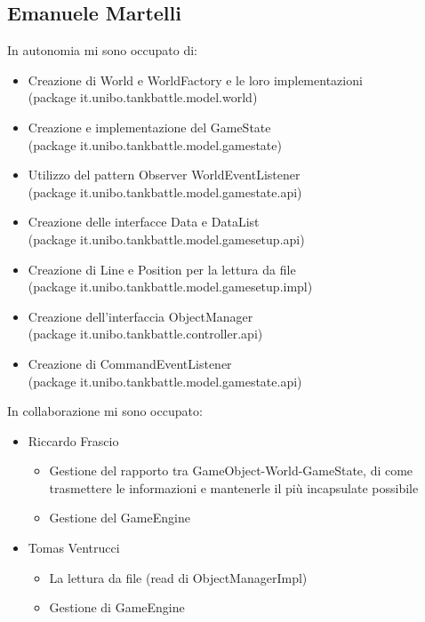 \documentclass[a4paper,12pt]{report}
\begin{document}
\subsection*{Emanuele Martelli}
In autonomia mi sono occupato di:
\begin{itemize}
	\item Creazione di World e WorldFactory e le loro implementazioni \\(package it.unibo.tankbattle.model.world)
	\item Creazione e implementazione del GameState\\ (package it.unibo.tankbattle.model.gamestate)
    \item Utilizzo del pattern Observer WorldEventListener\\
(package it.unibo.tankbattle.model.gamestate.api)
    \item Creazione delle interfacce Data e DataList \\
(package it.unibo.tankbattle.model.gamesetup.api)
    \item Creazione di Line e Position per la lettura da file \\
(package it.unibo.tankbattle.model.gamesetup.impl)
    \item Creazione dell’interfaccia ObjectManager \\
(package it.unibo.tankbattle.controller.api)
    \item Creazione di CommandEventListener \\
(package it.unibo.tankbattle.model.gamestate.api)
\end{itemize}
In collaborazione mi sono occupato:
\begin{itemize}
	\item Riccardo Frascio
    \begin{itemize}
        \item Gestione del rapporto tra GameObject-World-GameState, di come trasmettere le informazioni e mantenerle il più incapsulate possibile
        \item Gestione del GameEngine
    \end{itemize}
    \item Tomas Ventrucci
    \begin{itemize}
        \item La lettura da file (read di ObjectManagerImpl)
        \item Gestione di GameEngine 
    \end{itemize}
\end{itemize}
\end{document}
